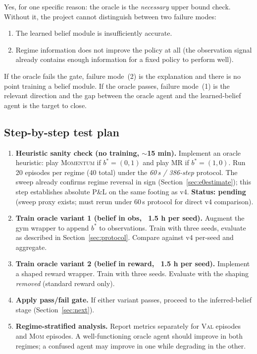 \documentclass[11pt]{article}
\begin{document}
Yes, for one specific reason: the oracle is the \emph{necessary} upper
bound check. Without it, the project cannot distinguish between two failure
modes:
\begin{enumerate}
  \item The learned belief module is insufficiently accurate.
  \item Regime information does not improve the policy at all (the
        observation signal already contains enough information for a
        fixed policy to perform well).
\end{enumerate}
If the oracle fails the gate, failure mode~(2) is the explanation and
there is no point training a belief module. If the oracle passes, failure
mode~(1) is the relevant direction and the gap between the oracle agent
and the learned-belief agent is the target to close.

\subsection{Step-by-step test plan}

\begin{enumerate}
  \item \textbf{Heuristic sanity check (no training, $\sim$15 min).}
        Implement an oracle heuristic: play \textsc{Momentum} if $b^*
        = (0,1)$ and play MR if $b^* = (1,0)$.
        Run 20 episodes per regime (40 total) under the \emph{60\,s /
        386-step} protocol.
        The sweep already confirms regime reversal in sign
        (Section~\ref{sec:e0estimate}); this step
        establishes absolute P\&L on the same footing as v4.
        \textbf{Status: pending} (sweep proxy exists; must rerun under
        60\,s protocol for direct v4 comparison).

  \item \textbf{Train oracle variant 1 (belief in obs, ~1.5 h per seed).}
        Augment the gym wrapper to append $b^*$ to observations.
        Train with three seeds, evaluate as described in
        Section~\ref{sec:protocol}. Compare against v4 per-seed and
        aggregate.

  \item \textbf{Train oracle variant 2 (belief in reward, ~1.5 h per seed).}
        Implement a shaped reward wrapper. Train with three seeds.
        Evaluate with the shaping \emph{removed} (standard reward only).

  \item \textbf{Apply pass/fail gate.} If either variant passes, proceed to
        the inferred-belief stage (Section~\ref{sec:next}).

  \item \textbf{Regime-stratified analysis.} Report metrics separately for
        \textsc{Val} episodes and \textsc{Mom} episodes. A well-functioning
        oracle agent should improve in both regimes; a confused agent may
        improve in one while degrading in the other.
\end{enumerate}
\end{document}
